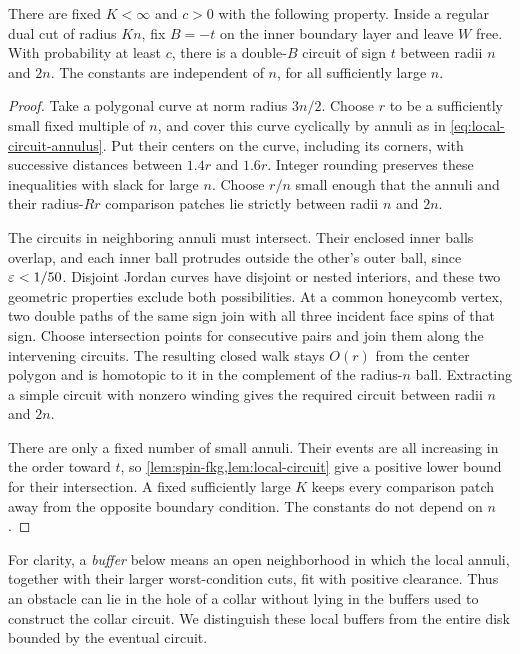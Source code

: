 \begin{lemma}\label{lem:worst-cut}
There are fixed $K<\infty$ and $c>0$ with the following property.
Inside a regular dual cut of radius $Kn$, fix $B=-t$ on the inner boundary
layer and leave $W$ free.  With probability at least $c$, there is a
double-$B$ circuit of sign $t$ between radii $n$ and $2n$.  The constants
are independent of $n$, for all sufficiently large $n$.
\end{lemma}
\begin{proof}
Take a polygonal curve at norm radius $3n/2$.  Choose $r$ to be a
sufficiently small fixed multiple of $n$, and cover this curve cyclically
by annuli as in \eqref{eq:local-circuit-annulus}.  Put their centers on
the curve, including its corners, with successive distances between
$1.4r$ and $1.6r$.  Integer rounding preserves these inequalities with
slack for large $n$.  Choose $r/n$ small enough that the annuli and their
radius-$Rr$ comparison patches lie strictly between radii $n$ and $2n$.

The circuits in neighboring annuli must intersect.  Their enclosed
inner balls overlap, and each inner ball protrudes outside the other's
outer ball, since $\varepsilon<1/50$.  Disjoint Jordan curves have disjoint or
nested interiors, and these two geometric properties exclude both
possibilities.  At a common honeycomb vertex, two double paths of the
same sign join with all three incident face spins of that sign.
Choose intersection points for consecutive pairs and join them along
the intervening circuits.  The resulting closed walk stays $O(r)$ from
the center polygon and is homotopic to it in the complement of the
radius-$n$ ball.  Extracting a simple circuit with nonzero winding gives
the required circuit between radii $n$ and $2n$.

There are only a fixed number of small annuli.  Their events are all
increasing in the order toward $t$, so \cref{lem:spin-fkg,lem:local-circuit}
give a positive lower bound for their intersection.  A fixed sufficiently
large $K$ keeps every comparison patch away from the opposite boundary
condition.  The constants do not depend on $n$.
\end{proof}

For clarity, a \emph{buffer} below means an open neighborhood in which
the local annuli, together with their larger worst-condition cuts, fit
with positive clearance.  Thus an obstacle can lie in the hole of a
collar without lying in the buffers used to construct the collar circuit.
We distinguish these local buffers from the entire disk bounded by the
eventual circuit.

